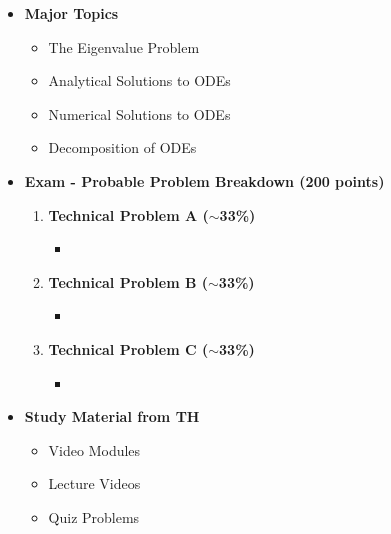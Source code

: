 \documentclass[11pt]{article}
\begin{document}
\begin{itemize}
\newpage

\item\textbf{\Large Major Topics}\\
	\begin{itemize}


		\item  {\large The Eigenvalue Problem}
		\item  {\large Analytical Solutions to ODEs}
		\item  {\large Numerical Solutions to ODEs}
		\item  {\large Decomposition of ODEs }

	\end{itemize}


%
\item  \textbf{\Large Exam  - Probable Problem Breakdown (200 points) }\\
\Large
	\begin{enumerate}


		\item  \textbf{\Large Technical Problem A ($\sim$33\%)}\\
		\begin{itemize}
			\item 
		\end{itemize}
		\item  \textbf{\Large Technical Problem B ($\sim$33\%)}\\
		\begin{itemize}
			\item 
		\end{itemize}
		\item  \textbf{\Large Technical Problem C ($\sim$33\%)}\\
		\begin{itemize}
			\item 

		\end{itemize}

	\end{enumerate}

\item  \textbf{\Large Study Material from TH}\\
\begin{itemize}

\item Video Modules 

\item Lecture Videos

\item Quiz Problems 

\end{itemize}

\end{itemize}


	
\end{document}
